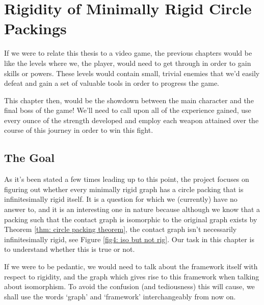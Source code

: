 \chapter{Rigidity of Minimally Rigid Circle Packings} %
\label{ch: 4}

\begin{flushleft}
If we were to relate this thesis to a video game, the previous chapters would be like the levels where we, the player, would need to get through in order to gain skills or powers. These levels would contain small, trivial enemies that we'd easily defeat and gain a set of valuable tools in order to progress the game.    
\end{flushleft}

\begin{flushleft}
This chapter then, would be the showdown between the main character and the final boss of the game! We'll need to call upon all of the experience gained, use every ounce of the strength developed and employ each weapon attained over the course of this journey in order to win this fight.
\end{flushleft}

\section{The Goal}

\begin{flushleft}
As it's been stated a few times leading up to this point, the project focuses on figuring out whether every minimally rigid graph has a circle packing that is infinitesimally rigid itself. It is a question for which we (currently) have no answer to, and it is an interesting one in nature because although we know that a packing such that the contact graph is isomorphic to the original graph exists by Theorem \ref{thm: circle packing theorem}, the contact graph isn't necessarily infinitesimally rigid, see Figure \ref{fig4: iso but not rig}. Our task in this chapter is to understand whether this is true or not. 
\end{flushleft}

\begin{flushleft} %
If we were to be pedantic, we would need to talk about the framework itself with respect to rigidity, and the graph which gives rise to this framework when talking about isomorphism. To avoid the confusion (and tediousness) this will cause, we shall use the words `graph' and `framework' interchangeably from now on. 
\end{flushleft}

